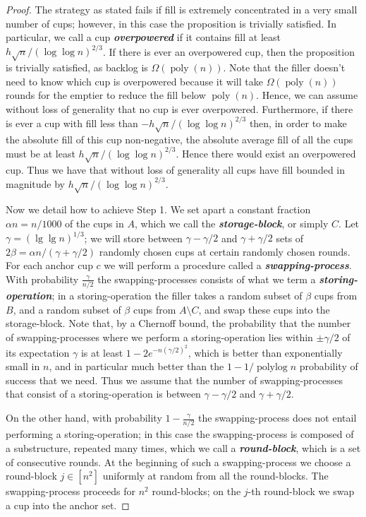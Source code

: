 \documentclass[twocolumn]{article}[10pt]
\newcommand{\defn}[1]{{\textit{\textbf{\boldmath #1}}}\xspace}
\DeclareMathOperator{\polylog}{\text{polylog}}
\DeclareMathOperator{\poly}{\text{poly}}
\begin{document}
\begin{proof}
The strategy as stated fails if fill is extremely concentrated in a very small
number of cups; however, in this case the proposition is trivially satisfied.
In particular, we call a cup \defn{overpowered} if it contains fill at least
$h\sqrt{n}/(\log\log n)^{2/3}$. If there is ever an overpowered cup, then the
proposition is trivially satisfied, as backlog is $\Omega(\poly(n))$. Note that
the filler doesn't need to know which cup is overpowered because it will take
$\Omega(\poly(n))$ rounds for the emptier to reduce the fill below $\poly(n)$.
Hence, we can assume without loss of generality that no cup is ever
overpowered. Furthermore, if there is ever a cup with fill less than
$-h\sqrt{n}/(\log\log n)^{2/3}$ then, in order to make the absolute fill of this cup
non-negative, the absolute average fill of all the cups must be at least
$h\sqrt{n}/(\log\log n)^{2/3}$. Hence there would exist an overpowered cup. Thus we
have that without loss of generality all cups have fill bounded in magnitude by
$h\sqrt{n}/(\log\log n)^{2/3}$.

Now we detail how to achieve Step 1.
We set apart a constant fraction $\alpha n= n/1000$ of the cups in $A$, which
we call the \defn{storage-block}, or simply $C$. Let $\gamma = (\lg\lg
n)^{1/3}$; we will store between
$\gamma -\gamma/2$ and $\gamma + \gamma/2$ sets of $2\beta = \alpha n / (\gamma +
\gamma/2)$ randomly chosen cups at certain randomly chosen rounds.
For each anchor cup $c$ we will perform a procedure called a \defn{swapping-process}. 
With probability $\frac{\gamma}{n/2}$ the swapping-processes consists of what
we term a \defn{storing-operation}; in a storing-operation the filler takes a 
random subset of $\beta$ cups from $B$, and a random subset of $\beta$ cups
from $A \setminus C$, and swap these cups into the storage-block.
Note that, by a Chernoff bound, the probability that the number of
swapping-processes where we perform a storing-operation lies within $\pm
\gamma/2$ of its expectation $\gamma$ is at least $1-2e^{-n(\gamma/2)^2}$,
which is better than exponentially small in $n$, and in particular much
better than the $1-1/\polylog n$ probability of success that we need.
Thus we assume that the number of swapping-processes that consist of a
storing-operation is between $\gamma- \gamma/2$ and $\gamma+\gamma/2$.

On the other hand, with probability $1-\frac{\gamma}{n/2}$ the swapping-process
does not entail performing a storing-operation; in this case the
swapping-process is composed of a substructure, repeated many times, which we
call a \defn{round-block}, which is a set of consecutive rounds. At the beginning of
such a swapping-process we choose a round-block $j \in [n^2]$ uniformly at
random from all the round-blocks. The swapping-process proceeds for $n^2$
round-blocks; on the $j$-th round-block we swap a cup into the anchor set.


\end{proof}
\end{document}
